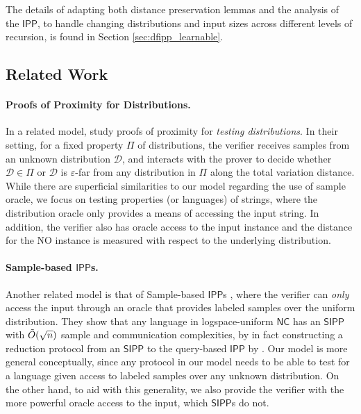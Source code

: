 \documentclass[11pt]{article}
\newcommand{\NC}{\mathsf{NC}}
\newcommand{\IPP}{\mathsf{IPP}}
\newcommand{\sD}{\mathcal{D}}
\begin{document}
The details of adapting both distance preservation lemmas and the analysis of the $\IPP$, to handle changing distributions and input sizes across different levels of recursion, is found in Section \ref{sec:dfipp_learnable}.

\subsection{Related Work}
\label{sec:rel_work}

\paragraph{Proofs of Proximity for Distributions.} In a related model, \cite{CG18,HR22} study proofs of proximity for \textit{testing distributions}. In their setting, for a fixed property $\Pi$ of distributions, the verifier receives samples from an unknown distribution $\sD$, and interacts with the prover to decide whether $\sD \in \Pi$ or $\sD$ is $\varepsilon$-far from any distribution in $\Pi$ along the total variation distance. While there are superficial similarities to our model regarding the use of sample oracle, we focus on testing properties (or languages) of strings, where the distribution oracle only provides a means of accessing the input string. In addition, the verifier also has oracle access to the input instance and the distance for the NO instance is measured with respect to the underlying distribution. 

\paragraph{Sample-based $\IPP$s.} Another related model is that of Sample-based $\IPP$s \cite{GR22_sample}, where the verifier can \textit{only} access the input through an oracle that provides labeled samples over the uniform distribution. They show that any language in logspace-uniform $\NC$ has an $\mathsf{SIPP}$ with $\Tilde{O}(\sqrt{n})$ sample and communication complexities, by in fact constructing a reduction protocol from an $\mathsf{SIPP}$ to the query-based $\IPP$ by \cite{RVW}. Our model is more general conceptually, since any protocol in our model needs to be able to test for a language given access to labeled samples over any unknown distribution. On the other hand, to aid with this generality, we also provide the verifier with the more powerful oracle access to the input, which $\mathsf{SIPP}$s do not. 
\end{document}
